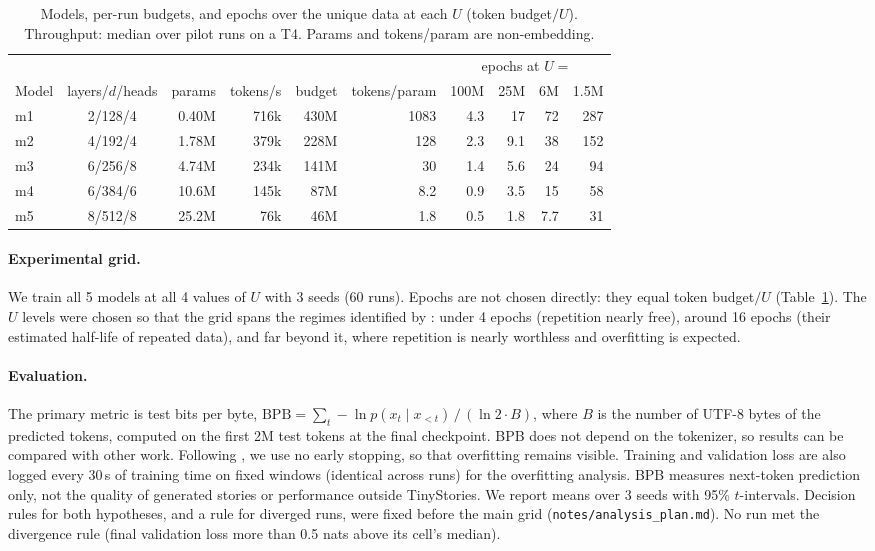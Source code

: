 \documentclass[11pt]{article}
\begin{document}
\begin{table}[h]\centering\small
\caption{Models, per-run budgets, and epochs over the unique data at each $U$ (token budget$/U$).
Throughput: median over pilot runs on a T4. Params and tokens/param are non-embedding.}
\label{tab:models}\label{tab:epochs}
\begin{tabular}{lcrrrrrrrr}\toprule
 & & & & & & \multicolumn{4}{c}{epochs at $U=$}\\\cmidrule(l){7-10}
Model & layers/$d$/heads & params & tokens/s & budget & tokens/param & 100M & 25M & 6M & 1.5M\\\midrule
m1 & 2/128/4 & 0.40M & 716k & 430M & 1083 & 4.3 & 17 & 72 & 287\\
m2 & 4/192/4 & 1.78M & 379k & 228M & 128 & 2.3 & 9.1 & 38 & 152\\
m3 & 6/256/8 & 4.74M & 234k & 141M & 30 & 1.4 & 5.6 & 24 & 94\\
m4 & 6/384/6 & 10.6M & 145k & 87M & 8.2 & 0.9 & 3.5 & 15 & 58\\
m5 & 8/512/8 & 25.2M & 76k & 46M & 1.8 & 0.5 & 1.8 & 7.7 & 31\\\bottomrule
\end{tabular}\end{table}

\paragraph{Experimental grid.}
We train all 5 models at all 4 values of $U$ with 3 seeds (60 runs). Epochs are not chosen directly:
they equal token budget$/U$ (Table~\ref{tab:epochs}). The $U$ levels were chosen so that the grid spans
the regimes identified by \citet{muennighoff2023scaling}: under 4 epochs (repetition nearly free), around
16 epochs (their estimated half-life of repeated data), and far beyond it, where repetition is nearly
worthless and overfitting is expected.


\paragraph{Evaluation.}
The primary metric is test bits per byte,
$\mathrm{BPB}=\sum_t -\ln p(x_t\mid x_{<t})\,/\,(\ln 2\cdot B)$, where $B$ is the number of UTF-8 bytes of
the predicted tokens, computed on the first 2M test tokens at the final checkpoint. BPB does not depend on
the tokenizer, so results can be compared with other work. Following \citet{muennighoff2023scaling}, we use
no early stopping, so that overfitting remains visible. Training and validation loss are also logged every
30\,s of training time on fixed windows (identical across runs) for the overfitting analysis. BPB measures
next-token prediction only, not the quality of generated stories or performance outside TinyStories. We
report means over 3 seeds with 95\% $t$-intervals. Decision rules for both hypotheses, and a rule for
diverged runs, were fixed before the main grid (\texttt{notes/analysis\_plan.md}). No run met the
divergence rule (final validation loss more than 0.5 nats above its cell's median).
\end{document}
